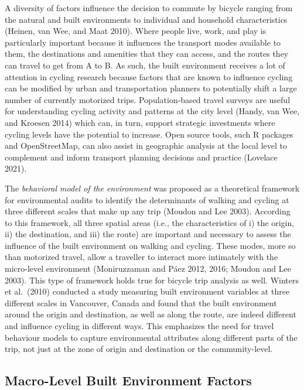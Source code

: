 \documentclass[smallextended]{svjour3}       %
\begin{document}
A diversity of factors influence the decision to commute by bicycle
ranging from the natural and built environments to individual and
household characteristics (Heinen, van Wee, and Maat 2010). Where people
live, work, and play is particularly important because it influences the
transport modes available to them, the destinations and amenities that
they can access, and the routes they can travel to get from A to B. As
such, the built environment receives a lot of attention in cycling
research because factors that are known to influence cycling can be
modified by urban and transportation planners to potentially shift a
large number of currently motorized trips. Population-based travel
surveys are useful for understanding cycling activity and patterns at
the city level (Handy, van Wee, and Kroesen 2014) which can, in turn,
support strategic investments where cycling levels have the potential to
increase. Open source tools, such R packages and OpenStreetMap, can also
assist in geographic analysis at the local level to complement and
inform transport planning decisions and practice (Lovelace 2021).

The \emph{behavioral model of the environment} was proposed as a
theoretical framework for environmental audits to identify the
determinants of walking and cycling at three different scales that make
up any trip (Moudon and Lee 2003). According to this framework, all
three spatial areas (i.e., the characteristics of i) the origin, ii) the
destination, and iii) the route) are important and necessary to assess
the influence of the built environment on walking and cycling. These
modes, more so than motorized travel, allow a traveller to interact more
intimately with the micro-level environment (Moniruzzaman and Páez 2012,
2016; Moudon and Lee 2003). This type of framework holds true for
bicycle trip analysis as well. Winters et al.~(2010) conducted a study
measuring built environment variables at three different scales in
Vancouver, Canada and found that the built environment around the origin
and destination, as well as along the route, are indeed different and
influence cycling in different ways. This emphasizes the need for travel
behaviour models to capture environmental attributes along different
parts of the trip, not just at the zone of origin and destination or the
community-level.

\hypertarget{macro}{%
\subsection{Macro-Level Built Environment Factors}\label{macro}}
\end{document}
